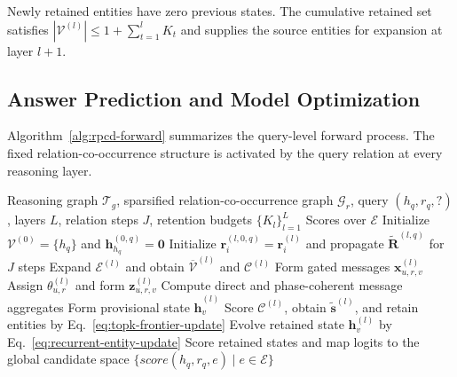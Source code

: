 \documentclass[a4paper,fleqn]{cas-dc}
\begin{document}
Newly retained entities have zero previous states. The cumulative retained set satisfies $|\mathcal{V}^{(l)}|\leq 1+\sum_{t=1}^{l}K_t$ and supplies the source entities for expansion at layer $l+1$.

\subsection{Answer Prediction and Model Optimization}\label{subsec:model-training}

Algorithm~\ref{alg:rpcd-forward} summarizes the query-level forward process. The fixed relation-co-occurrence structure is activated by the query relation at every reasoning layer.

\begin{algorithm}[t]
\caption{Query-conditioned relation propagation and phase-aware message aggregation in RPCD-GNN}
\label{alg:rpcd-forward}
\begin{algorithmic}[1]
\Require Reasoning graph $\mathcal{T}_{g}$, sparsified relation-co-occurrence graph $\mathcal{G}_{r}$, query $(h_q,r_q,?)$, layers $L$, relation steps $J$, retention budgets $\{K_l\}_{l=1}^{L}$
\Ensure Scores over $\mathcal{E}$
\State Initialize $\mathcal{V}^{(0)}=\{h_q\}$ and $\mathbf{h}_{h_q}^{(0,q)}=\mathbf{0}$
    \State Initialize $\mathbf{r}_{i}^{(l,0,q)}=\mathbf{r}_{i}^{(l)}$ and propagate $\widetilde{\mathbf{R}}^{(l,q)}$ for $J$ steps
    \State Expand $\mathcal{E}^{(l)}$ and obtain $\overline{\mathcal{V}}^{(l)}$ and $\mathcal{C}^{(l)}$
        \State Form gated messages $\mathbf{x}_{u,r,v}^{(l)}$
        \State Assign $\theta_{u,r}^{(l)}$ and form $\mathbf{z}_{u,r,v}^{(l)}$
    \EndFor
        \State Compute direct and phase-coherent message aggregates
        \State Form provisional state $\widehat{\mathbf{h}}_{v}^{(l)}$
    \EndFor
    \State Score $\mathcal{C}^{(l)}$, obtain $\widetilde{\mathbf{s}}^{(l)}$, and retain entities by Eq.~\eqref{eq:topk-frontier-update}
        \State Evolve retained state $\mathbf{h}_{v}^{(l)}$ by Eq.~\eqref{eq:recurrent-entity-update}
    \EndFor
\EndFor
\State Score retained states and map logits to the global candidate space
\State \Return $\{score(h_q,r_q,e)\mid e\in\mathcal{E}\}$
\end{algorithmic}
\end{algorithm}
\end{document}
